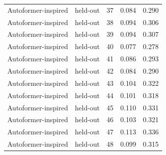 \begin{tabular}{llrrr}
Autoformer-inspired & held-out & 37 & 0.084 & 0.290 \\
Autoformer-inspired & held-out & 38 & 0.094 & 0.306 \\
Autoformer-inspired & held-out & 39 & 0.094 & 0.307 \\
Autoformer-inspired & held-out & 40 & 0.077 & 0.278 \\
Autoformer-inspired & held-out & 41 & 0.086 & 0.293 \\
Autoformer-inspired & held-out & 42 & 0.084 & 0.290 \\
Autoformer-inspired & held-out & 43 & 0.104 & 0.322 \\
Autoformer-inspired & held-out & 44 & 0.101 & 0.318 \\
Autoformer-inspired & held-out & 45 & 0.110 & 0.331 \\
Autoformer-inspired & held-out & 46 & 0.103 & 0.321 \\
Autoformer-inspired & held-out & 47 & 0.113 & 0.336 \\
Autoformer-inspired & held-out & 48 & 0.099 & 0.315 \\
\bottomrule
\end{tabular}
